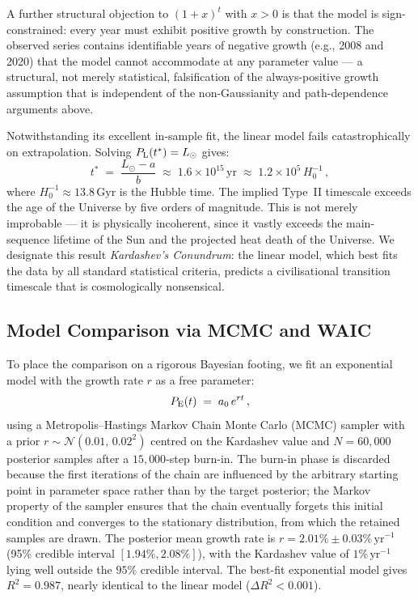 \documentclass[final,5p,times,twocolumn,authoryear]{elsarticle}
\begin{document}
A further structural objection to $(1+x)^t$ with $x > 0$ is 
that the model is sign-constrained: every year must exhibit 
positive growth by construction. The observed series contains 
identifiable years of negative growth (e.g., 2008 and 2020) that 
the model cannot accommodate at any parameter value --- a 
structural, not merely statistical, falsification of the 
always-positive growth assumption that is independent of the 
non-Gaussianity and path-dependence arguments above.
 
Notwithstanding its excellent in-sample fit, the linear model fails
catastrophically on extrapolation. Solving $P_{\rm L}(t^*) = L_\odot$ gives:
\begin{equation}
    t^* \;=\; \frac{L_\odot - a}{b}
    \;\approx\; 1.6 \times 10^{15}\,\mathrm{yr}
    \;\approx\; 1.2 \times 10^{5}\,H_0^{-1}\,,
    \label{eq:linear_typeii}
\end{equation}
where $H_0^{-1} \approx 13.8\,\mathrm{Gyr}$ is the Hubble time. The implied
Type~II timescale exceeds the age of the Universe by five orders of magnitude.
This is not merely improbable --- it is physically incoherent, since it
vastly exceeds the main-sequence lifetime of the Sun and the projected heat
death of the Universe. We designate this result \textit{Kardashev's
Conundrum}: the linear model, which best fits the data by all standard
statistical criteria, predicts a civilisational transition timescale that is
cosmologically nonsensical.
 
\subsection{Model Comparison via MCMC and WAIC}
\label{sec:model_comparison}
 
To place the comparison on a rigorous Bayesian footing, we fit an exponential
model with the growth rate $r$ as a free parameter:
\begin{equation}
    P_{\rm E}(t) \;=\; a_0\,e^{r t}\,,
    \label{eq:exp_free}
\end{equation}
using a Metropolis--Hastings Markov Chain Monte Carlo (MCMC) sampler 
\citep{Metropolis1953,Hastings1970} with a prior 
$r \sim \mathcal{N}(0.01,\, 0.02^2)$ centred on the Kardashev value
and $N = 60{,}000$ posterior samples after a $15{,}000$-step burn-in. 
The burn-in phase is discarded because the first iterations of the 
chain are influenced by the arbitrary starting point in parameter 
space rather than by the target posterior; the Markov property of 
the sampler ensures that the chain eventually forgets this initial 
condition and converges to the stationary distribution, from which 
the retained samples are drawn. The
posterior mean growth rate is $r = 2.01\% \pm 0.03\%\,\mathrm{yr}^{-1}$
(95\% credible interval $[1.94\%, 2.08\%]$), with the Kardashev value of
$1\%\,\mathrm{yr}^{-1}$ lying well outside the $95\%$ credible interval.
The best-fit exponential model gives $R^2 = 0.987$, nearly identical to the
linear model ($\Delta R^2 < 0.001$).
 
\end{document}
